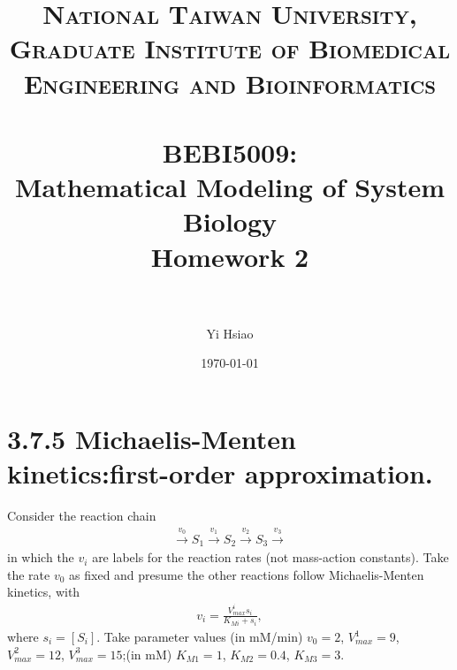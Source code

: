 \documentclass[paper=a4, fontsize=11pt]{scrartcl} %
\title{	
\normalfont \normalsize 
\textsc{National Taiwan University, \\ Graduate Institute of Biomedical Engineering and Bioinformatics} \\ [25pt] %
\horrule{0.5pt} \\[0.4cm] %
\huge BEBI5009:\\Mathematical Modeling of System Biology \\ Homework 2 \\ %
\horrule{2pt} \\[0.5cm] %
}
\author{Yi Hsiao} %
\date{\normalsize\today} %
\numberwithin{equation}{section} %
\numberwithin{figure}{section} %
\numberwithin{table}{section} %
\begin{document}
\maketitle %

\newpage
\section{3.7.5 Michaelis-Menten kinetics:first-order approximation.}
	Consider the reaction chain
	\begin{gather*}
		\xrightarrow{v_0} S_1 \xrightarrow{v_1} S_2 \xrightarrow{v_2} S_3 \xrightarrow{v_3} 
	\end{gather*}
	in which the $v_i$ are labels for the reaction rates (not mass-action constants). Take the rate $v_0$ as fixed and presume the other reactions follow Michaelis-Menten kinetics, with
	\begin{gather*}
		v_i=\frac{V^i_{max}s_i}{K_{Mi}+s_i},
	\end{gather*}
	where $s_i=[S_i]$. Take parameter values (in mM/min) $v_0=2$, $V^1_{max} = 9$, $V^2_{max}=12$, $V^3_{max}=15$;(in mM) $K_{M1} = 1$, $K_{M2} = 0.4$, $K_{M3} = 3$.
\end{document}
